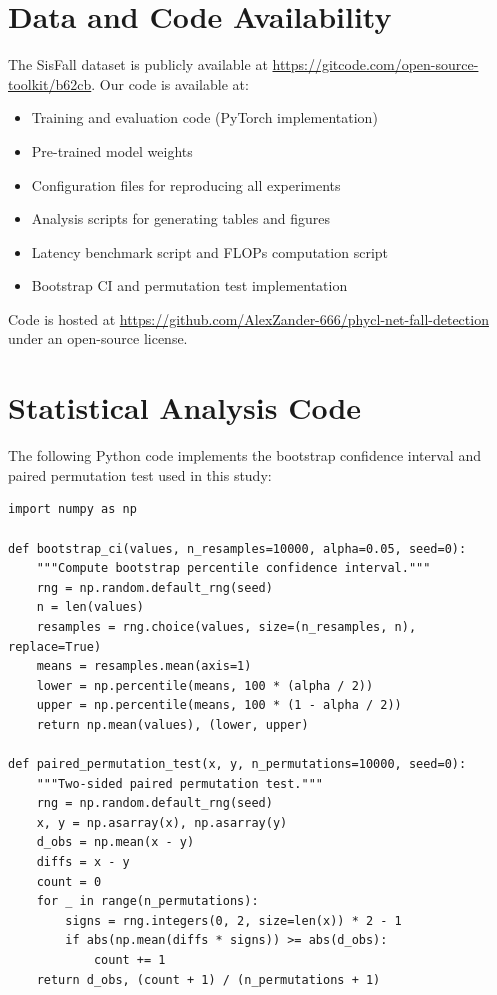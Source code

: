 \documentclass{article}
\begin{document}
\section*{Data and Code Availability}

The SisFall dataset is publicly available at \url{https://gitcode.com/open-source-toolkit/b62cb}. Our code is available at:
\begin{itemize}
    \item Training and evaluation code (PyTorch implementation)
    \item Pre-trained model weights
    \item Configuration files for reproducing all experiments
    \item Analysis scripts for generating tables and figures
    \item Latency benchmark script and FLOPs computation script
    \item Bootstrap CI and permutation test implementation
\end{itemize}
Code is hosted at \url{https://github.com/AlexZander-666/phycl-net-fall-detection} under an open-source license.

\appendix
\section{Statistical Analysis Code}
\label{app:stats_code}

The following Python code implements the bootstrap confidence interval and paired permutation test used in this study:

\begin{verbatim}
import numpy as np

def bootstrap_ci(values, n_resamples=10000, alpha=0.05, seed=0):
    """Compute bootstrap percentile confidence interval."""
    rng = np.random.default_rng(seed)
    n = len(values)
    resamples = rng.choice(values, size=(n_resamples, n), replace=True)
    means = resamples.mean(axis=1)
    lower = np.percentile(means, 100 * (alpha / 2))
    upper = np.percentile(means, 100 * (1 - alpha / 2))
    return np.mean(values), (lower, upper)

def paired_permutation_test(x, y, n_permutations=10000, seed=0):
    """Two-sided paired permutation test."""
    rng = np.random.default_rng(seed)
    x, y = np.asarray(x), np.asarray(y)
    d_obs = np.mean(x - y)
    diffs = x - y
    count = 0
    for _ in range(n_permutations):
        signs = rng.integers(0, 2, size=len(x)) * 2 - 1
        if abs(np.mean(diffs * signs)) >= abs(d_obs):
            count += 1
    return d_obs, (count + 1) / (n_permutations + 1)
\end{verbatim}
\end{document}

